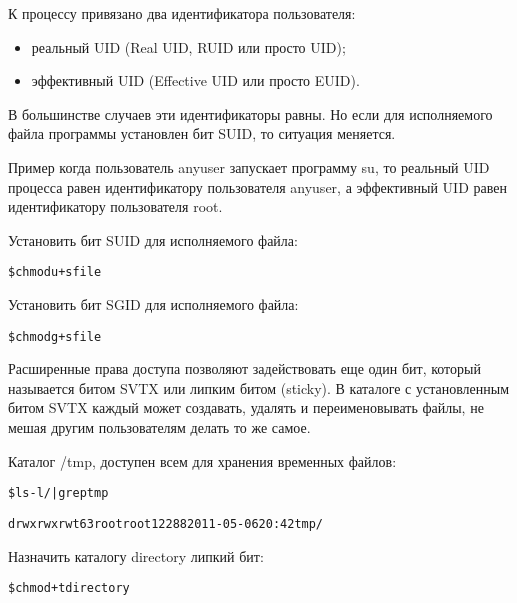 \documentclass{beamer}
\begin{document}
\begin{frame}[fragile]
К процессу привязано два идентификатора пользователя:
\begin{itemize}
\item реальный UID (Real UID, RUID или просто UID);
\item эффективный UID (Effective UID или просто EUID).
\end{itemize}
В большинстве случаев эти идентификаторы равны. Но если для исполняемого
файла программы установлен бит SUID, то ситуация меняется. 
\begin{block}{Пример}
когда пользователь anyuser запускает программу su, то реальный UID процесса равен идентификатору пользователя anyuser, а эффективный UID равен идентификатору пользователя root.
\end{block}
\begin{block}{Установить бит SUID для исполняемого файла:}
\begin{alltt}
\$ chmod u+s file
\end{alltt}
\end{block}
\begin{block}{Установить бит SGID для исполняемого файла:}
\begin{alltt}
\$ chmod g+s file
\end{alltt}
\end{block}
\end{frame}

\begin{frame}[fragile]
Расширенные права доступа позволяют задействовать еще один бит, который называется битом SVTX или липким битом (sticky). В каталоге с установленным битом SVTX каждый может создавать, удалять и переименовывать файлы, не мешая другим пользователям делать то же самое.  
\begin{block}{Каталог /tmp, доступен всем для хранения временных файлов:}
\begin{alltt}
\$ ls -l / | grep tmp

drwxrwxrwt 63 root root 12288 2011-05-06 20:42 tmp/
\end{alltt}
\end{block}
\begin{block}{Назначить каталогу directory липкий бит:}
\begin{alltt}
\$ chmod +t directory
\end{alltt}
\end{block}
\end{frame}
\end{document}

